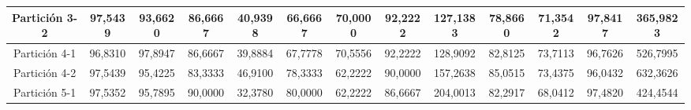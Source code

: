 \documentclass[12pt]{article}
\begin{document}
\begin{table}[H]
{\begin{tabular}{|c|cccc|cccc|cccc|}
Partición 3-2 & \multicolumn{1}{c|}{97,5439}                                                  & \multicolumn{1}{c|}{93,6620}                                                 & \multicolumn{1}{c|}{86,6667} & 40,9398 & \multicolumn{1}{c|}{66,6667}                                                  & \multicolumn{1}{c|}{70,0000}                                                 & \multicolumn{1}{c|}{92,2222} & 127,1383 & \multicolumn{1}{c|}{78,8660}                                                  & \multicolumn{1}{c|}{71,3542}                                                 & \multicolumn{1}{c|}{97,8417} & 365,9823 \\ \hline
Partición 4-1 & \multicolumn{1}{c|}{96,8310}                                                  & \multicolumn{1}{c|}{97,8947}                                                 & \multicolumn{1}{c|}{86,6667} & 39,8884 & \multicolumn{1}{c|}{67,7778}                                                  & \multicolumn{1}{c|}{70,5556}                                                 & \multicolumn{1}{c|}{92,2222} & 128,9092 & \multicolumn{1}{c|}{82,8125}                                                  & \multicolumn{1}{c|}{73,7113}                                                 & \multicolumn{1}{c|}{96,7626} & 526,7995 \\ \hline
Partición 4-2 & \multicolumn{1}{c|}{97,5439}                                                  & \multicolumn{1}{c|}{95,4225}                                                 & \multicolumn{1}{c|}{83,3333} & 46,9100 & \multicolumn{1}{c|}{78,3333}                                                  & \multicolumn{1}{c|}{62,2222}                                                 & \multicolumn{1}{c|}{90,0000} & 157,2638 & \multicolumn{1}{c|}{85,0515}                                                  & \multicolumn{1}{c|}{73,4375}                                                 & \multicolumn{1}{c|}{96,0432} & 632,3626 \\ \hline
Partición 5-1 & \multicolumn{1}{c|}{97,5352}                                                  & \multicolumn{1}{c|}{95,7895}                                                 & \multicolumn{1}{c|}{90,0000} & 32,3780 & \multicolumn{1}{c|}{80,0000}                                                  & \multicolumn{1}{c|}{62,2222}                                                 & \multicolumn{1}{c|}{86,6667} & 204,0013 & \multicolumn{1}{c|}{82,2917}                                                  & \multicolumn{1}{c|}{68,0412}                                                 & \multicolumn{1}{c|}{97,4820} & 424,4544 \\ \hline

\end{tabular}}
\end{table}
\end{document}
